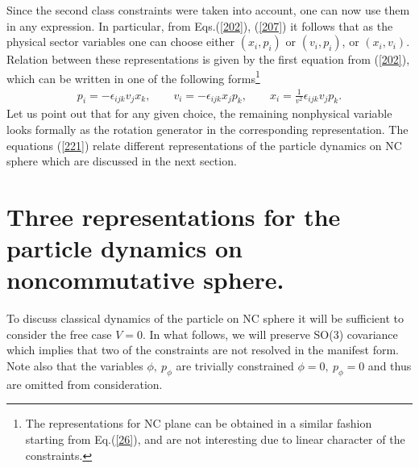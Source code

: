 \documentclass[paper a4]{article}
\begin{document}
Since the second class constraints were taken into account, one can
now use them in any expression. In particular, from Eqs.(\ref{202}),
(\ref{207}) it follows that as the physical sector variables one can
choose either $(x_i, p_i)$ or $(v_i, p_i)$, or $(x_i, v_i)$.
Relation between these representations is given by the first equation
from (\ref{202}), which can be written in one of the following
forms\footnote{The representations for NC plane can be obtained
in a similar fashion starting from Eq.(\ref{26}), and are not interesting
due to linear character of the constraints.}
\begin{eqnarray}\label{221}
p_i=-\epsilon_{ijk}v_jx_k, \qquad
v_i=-\epsilon_{ijk}x_jp_k, \qquad
x_i=\frac{1}{v^2}\epsilon_{ijk}v_jp_k.
\end{eqnarray}
Let us point out that for any given choice, the remaining nonphysical
variable looks formally as the rotation generator in the corresponding
representation. The equations (\ref{221}) relate different
representations of the particle
dynamics on NC sphere which are discussed in the next section.

\section{Three representations for the particle dynamics on
noncommutative sphere.}
To discuss classical dynamics of the particle on NC sphere it will be
sufficient to consider the free case $V=0$. In what follows, we will
preserve SO(3) covariance which implies that two of the constraints are not
resolved in the manifest form. Note also that the
variables $\phi, ~ p_{\phi}$ are trivially constrained $\phi=0, ~
p_{\phi}=0$ and thus are omitted from consideration.
\end{document}
